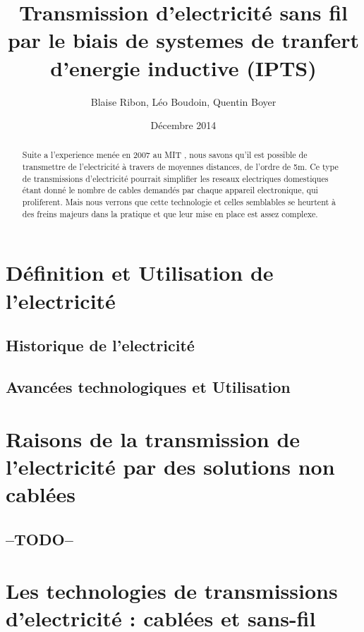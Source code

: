 \documentclass[11pt]{report}
\begin{document}

\title{Transmission d'electricité sans fil par le biais de systemes de tranfert d'energie inductive (IPTS)}
\author{Blaise Ribon, Léo Boudoin, Quentin Boyer}
\date{Décembre 2014}
\maketitle

\begin{abstract}
	Suite a l'experience menée en 2007 au MIT , nous savons qu'il est possible de transmettre de l'electricité à travers de moyennes distances, de l'ordre de 5m. Ce type de transmissions d'electricité pourrait simplifier les reseaux electriques domestiques étant donné le nombre de cables demandés par chaque appareil electronique, qui proliferent. Mais nous verrons que cette technologie et celles semblables se heurtent à des freins majeurs dans la pratique et que leur mise en place est assez complexe.
\end{abstract}

\tableofcontents

\chapter{Définition et Utilisation de l'electricité} %
\section{Historique de l'electricité}
	
\section{Avancées technologiques et Utilisation}

\chapter{Raisons de la transmission de l'electricité par des solutions non cablées} %
\section{--TODO--}

\chapter{Les technologies de transmissions d'electricité : cablées et sans-fil} %
\end{document}
